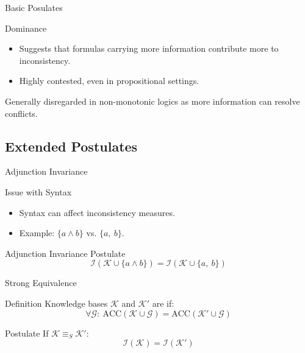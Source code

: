 \begin{frame}{Basic Posulates}
    \begin{alertblock}{Dominance}
        \begin{itemize}
            \item Suggests that formulas carrying more information contribute more to inconsistency.
            \item Highly contested, even in propositional settings.
        \end{itemize}
    \end{alertblock}
    Generally disregarded in non-monotonic logics as more information can resolve conflicts.
\end{frame}

\subsection{Extended Postulates}

\begin{frame}{Adjunction Invariance}
    \begin{block}{Issue with Syntax}
        \begin{itemize}
            \item Syntax can affect inconsistency measures.
            \item Example: \(\{a \land b\}\) vs. \(\{a,\ b\}\).
        \end{itemize}
    \end{block}
    \begin{block}{Adjunction Invariance Postulate}
        \[
            \mathcal{I}(\mathcal{K} \cup \{a \land b\}) = \mathcal{I}(\mathcal{K} \cup \{a,\ b\})
        \]
    \end{block}
\end{frame}

\begin{frame}{Strong Equivalence}
    \begin{block}{Definition}
        Knowledge bases \(\mathcal{K}\) and \(\mathcal{K}'\) are  if:
        \[
            \forall \mathcal{G}:\ \text{ACC}(\mathcal{K} \cup \mathcal{G}) = \text{ACC}(\mathcal{K}' \cup \mathcal{G})
        \]
    \end{block}
    \begin{block}{Postulate}
        If \(\mathcal{K} \equiv_S \mathcal{K}'\):
        \[
            \mathcal{I}(\mathcal{K}) = \mathcal{I}(\mathcal{K}')
        \]
    \end{block}
\end{frame}

